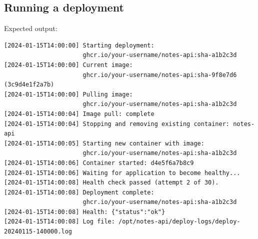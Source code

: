 \begin{codebox}[short]

\begin{Shaded}
\begin{Highlighting}[]
\end{Highlighting}
\end{Shaded}

\end{codebox}

\subsection*{Running a deployment}\label{23-code-transfer:running-a-deployment}

\begin{codebox}[short]

\begin{Shaded}
\begin{Highlighting}[]
\end{Highlighting}
\end{Shaded}

\end{codebox}

\noindent{}Expected output:

\begin{outputbox}[short]
\begin{Verbatim}[fontsize=\codesize, breaklines, breakanywhere, breaksymbolleft={\tiny\textcolor{muted}{$\hookrightarrow$}}]
[2024-01-15T14:00:00] Starting deployment:
                      ghcr.io/your-username/notes-api:sha-a1b2c3d
[2024-01-15T14:00:00] Current image:
                      ghcr.io/your-username/notes-api:sha-9f8e7d6 (3c9d4e1f2a7b)
[2024-01-15T14:00:00] Pulling image:
                      ghcr.io/your-username/notes-api:sha-a1b2c3d
[2024-01-15T14:00:04] Image pull: complete
[2024-01-15T14:00:04] Stopping and removing existing container: notes-api
[2024-01-15T14:00:05] Starting new container with image:
                      ghcr.io/your-username/notes-api:sha-a1b2c3d
[2024-01-15T14:00:06] Container started: d4e5f6a7b8c9
[2024-01-15T14:00:06] Waiting for application to become healthy...
[2024-01-15T14:00:08] Health check passed (attempt 2 of 30).
[2024-01-15T14:00:08] Deployment complete:
                      ghcr.io/your-username/notes-api:sha-a1b2c3d
[2024-01-15T14:00:08] Health: {"status":"ok"}
[2024-01-15T14:00:08] Log file: /opt/notes-api/deploy-logs/deploy-20240115-140000.log
\end{Verbatim}
\end{outputbox}

